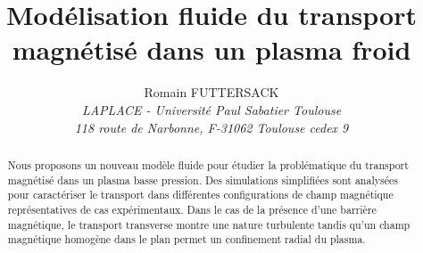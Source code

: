 \documentclass[a4paper,11pt]{article} %
\title{
\vspace{-50pt}
\textbf{\Large{Modélisation fluide du transport magnétisé dans un plasma froid}}}
\author{\large{Romain FUTTERSACK}\\
\large{\emph{LAPLACE - Université Paul Sabatier Toulouse}}\\
\large{\emph{118 route de Narbonne, F-31062 Toulouse cedex 9}}}
\date{}
\begin{document}
\maketitle
\newcommand{\vecMath}[1]{\mathbf{#1}}
\renewcommand{\abstractname}{Résumé}
\abslabeldelim{:~}
\renewcommand{\abstractnamefont}{\normalsize\textbf}
\renewcommand{\abstracttextfont}{\small}

\renewcommand{\cftdotsep}{\cftnodots}
\renewcommand{\cftfigpresnum}{\textbf{FIG.~}}
\renewcommand{\cftfigaftersnum}{.}


\setlength{\absparsep}{0cm}
\setlength{\absleftindent}{1.27cm}
\setlength{\absrightindent}{2.67cm}
\sectionfont{\large\textbf}

\begin{abstract}
Nous proposons un nouveau modèle fluide pour étudier la problématique du transport magnétisé dans un plasma basse pression.
Des simulations simplifiées sont analysées pour caractériser le transport dans différentes
configurations de champ magnétique représentatives de cas expérimentaux. Dans le cas de la présence d'une barrière
magnétique, le transport transverse montre une nature turbulente tandis qu'un champ magnétique homogène dans 
le plan permet un confinement radial du plasma.
\end{abstract}
\end{document}
